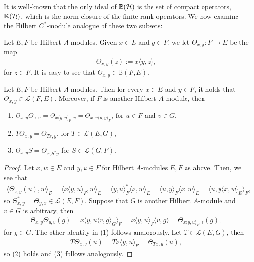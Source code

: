 It is well-known that the only ideal of $\mathbb{B}(\mathcal{H})$ is the set of compact operators, $\mathbb{K}(\mathcal{H})$, which is the norm closure of the finite-rank operators. We now examine the Hilbert $C^*$-module analogue of these two subsets:
\begin{definition}
	Let $E,F$ be Hilbert $A$-modules. Given $x \in E$ and $y \in F$, we let $\Theta_{x,y} \colon F \to E$ be the map
	\begin{align*}
		\Theta_{x,y}(z):=x \langle y,z \rangle,
	\end{align*}
	for $z \in F$. It is easy to see that $\Theta_{x,y} \in \mathbb{B}(F,E)$. 
\end{definition}
\begin{proposition}
	Let $E,F$ be Hilbert $A$-modules. Then for every $x \in E$ and $y \in F$, it holds that $\Theta_{x,y} \in \mathcal{L}(F,E)$. Moreover, if $F$ is another Hilbert $A$-module, then
	\begin{enumerate}
		\item $\Theta_{x,y}\Theta_{u,v}=\Theta_{x \langle y,u \rangle_F,v} = \Theta_{x,v \langle u,y\rangle_F}$, for $u \in F$ and $v \in G$,
		\item $T \Theta_{x,y} = \Theta_{Tx,y}$, for $T \in \mathcal{L}(E,G)$,
		\item $\Theta_{x,y}S = \Theta_{x,S^* y}$ for $S \in \mathcal{L}(G,F)$.
	\end{enumerate}
	\label{frnkideal}
\end{proposition}
\begin{proof}
Let $x,w \in E$ and $y,u \in F$ for Hilbert $A$-modules $E,F$ as above. Then, we see that
\begin{align*}
		\langle \Theta_{x,y}(u),w\rangle_E = \langle x \langle y,u\rangle_{F}, w\rangle_{E} =  \langle y,u \rangle_F^* \langle x,w\rangle_E = \langle u,y \rangle_F \langle x,w\rangle_E = \langle u, y\langle x,w\rangle_E \rangle_F,
\end{align*}
so $\Theta_{x,y}^* = \Theta_{y,x} \in \mathcal{L}(E,F)$. Suppose that $G$ is another Hilbert $A$-module and $v \in G$ is arbitrary, then
\begin{align*}
	\Theta_{x,y}\Theta_{u,v}(g) = x \langle y, u \langle v,g \rangle_G \rangle_F = x \langle y, u \rangle_F \langle v,g \rangle=\Theta_{x \langle y,u \rangle_F, v}(g),
\end{align*}
for $g \in G$. The other identity in (1) follows analogously. Let $T \in \mathcal{L}(E,G)$, then
\begin{align*}
	T \Theta_{x,y}(u) = T x \langle y,u \rangle_F = \Theta_{Tx,y}(u),
\end{align*}
so (2) holds and (3) follows analogously.
\end{proof}
